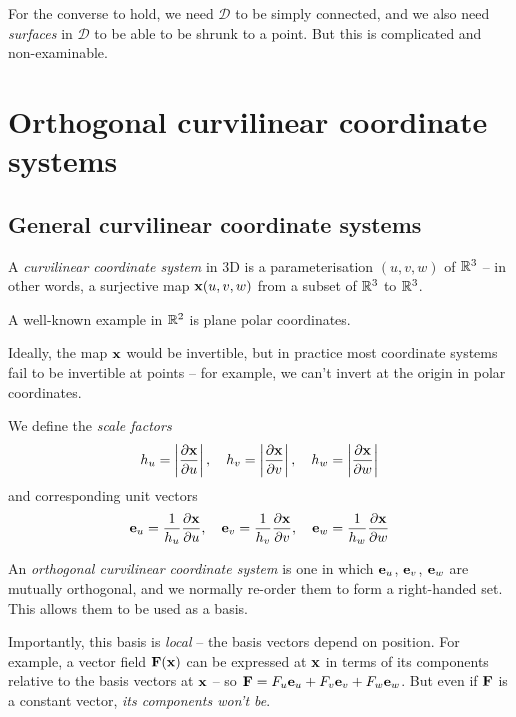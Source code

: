 \documentclass{../template/note}
\begin{document}
    \begin{remark*}
        For the converse to hold, we need \(\mathscr D\) to be simply connected, and we also need \emph{surfaces} in \(\mathscr D\) to be able to be shrunk to a point. But this is complicated and non-examinable.
    \end{remark*}
    
    \section{Orthogonal curvilinear coordinate systems}

    \subsection{General curvilinear coordinate systems}

    \begin{definition*}
        A \emph{curvilinear coordinate system} in 3D is a parameterisation \((u, v, w)\) of \(\mathbb R^3\) -- in other words, a surjective map \(\V x(u, v, w)\) from a subset of \(\mathbb R^3\) to \(\mathbb R^3\).
    \end{definition*}
    
    A well-known example in \(\mathbb R^2\) is plane polar coordinates.

    \begin{remark*}
        Ideally, the map \(\V x\) would be invertible, but in practice most coordinate systems fail to be invertible at points -- for example, we can't invert at the origin in polar coordinates.
    \end{remark*}
    We define the \emph{scale factors}
    \begin{align*}
        h_u = \left|\pd{\V x}{u}\right|,\quad h_v = \left|\pd{\V x}{v}\right|,\quad h_w = \left|\pd{\V x}{w}\right|
    \end{align*}
    and corresponding unit vectors
    \begin{align*}
        \V e_u = \frac 1{h_u} \pd{\V x}{u}, \quad \V e_v = \frac 1{h_v} \pd{\V x}{v}, \quad \V e_w = \frac 1{h_w} \pd{\V x}{w}
    \end{align*}
    \begin{definition*}
        An \emph{orthogonal curvilinear coordinate system} is one in which \(\V e_u\), \(\V e_v\), \(\V e_w\) are mutually orthogonal, and we normally re-order them to form a right-handed set. This allows them to be used as a basis.
    \end{definition*}
    Importantly, this basis is \emph{local} -- the basis vectors depend on position. For example, a vector field \(\V F(\V x)\) can be expressed at \(\V x\) in terms of its components relative to the basis vectors at \(\V x\) -- so \(\V F = F_u \V e_u + F_v \V e_v + F_w \V e_w\). But even if \(\V F\) is a constant vector, \emph{its components won't be}.
    
\end{document}
